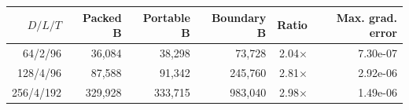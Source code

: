 \begin{tabular}{rrrrrr}
\toprule
$D/L/T$ & Packed B & Portable B & Boundary B & Ratio & Max. grad. error \\
\midrule
64/2/96 & 36,084 & 38,298 & 73,728 & 2.04$\times$ & 7.30e-07 \\
128/4/96 & 87,588 & 91,342 & 245,760 & 2.81$\times$ & 2.92e-06 \\
256/4/192 & 329,928 & 333,715 & 983,040 & 2.98$\times$ & 1.49e-06 \\
\bottomrule
\end{tabular}

